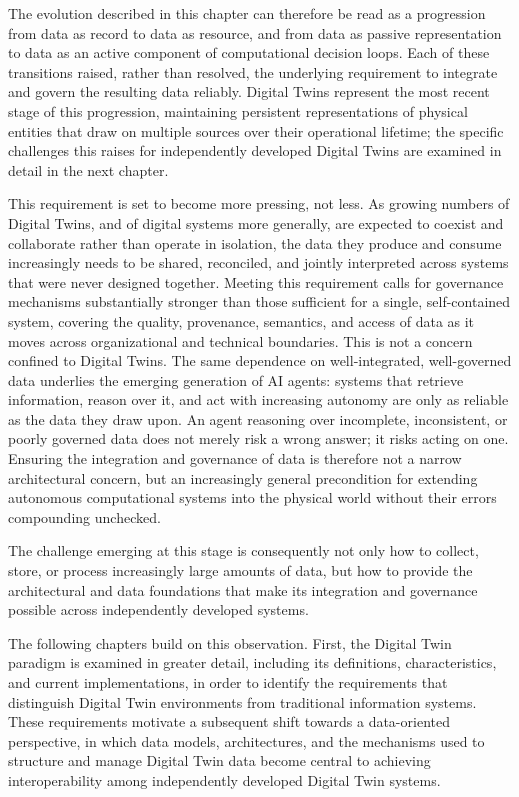 The evolution described in this chapter can therefore be read as a progression from data as record to data as resource, and from data as passive representation to data as an active component of computational decision loops. Each of these transitions raised, rather than resolved, the underlying requirement to integrate and govern the resulting data reliably. Digital Twins represent the most recent stage of this progression, maintaining persistent representations of physical entities that draw on multiple sources over their operational lifetime; the specific challenges this raises for independently developed Digital Twins are examined in detail in the next chapter.

This requirement is set to become more pressing, not less. As growing numbers of Digital Twins, and of digital systems more generally, are expected to coexist and collaborate rather than operate in isolation, the data they produce and consume increasingly needs to be shared, reconciled, and jointly interpreted across systems that were never designed together. Meeting this requirement calls for governance mechanisms substantially stronger than those sufficient for a single, self-contained system, covering the quality, provenance, semantics, and access of data as it moves across organizational and technical boundaries. This is not a concern confined to Digital Twins. The same dependence on well-integrated, well-governed data underlies the emerging generation of AI agents: systems that retrieve information, reason over it, and act with increasing autonomy are only as reliable as the data they draw upon. An agent reasoning over incomplete, inconsistent, or poorly governed data does not merely risk a wrong answer; it risks acting on one. Ensuring the integration and governance of data is therefore not a narrow architectural concern, but an increasingly general precondition for extending autonomous computational systems into the physical world without their errors compounding unchecked.

The challenge emerging at this stage is consequently not only how to collect, store, or process increasingly large amounts of data, but how to provide the architectural and data foundations that make its integration and governance possible across independently developed systems.

The following chapters build on this observation. First, the Digital Twin paradigm is examined in greater detail, including its definitions, characteristics, and current implementations, in order to identify the requirements that distinguish Digital Twin environments from traditional information systems. These requirements motivate a subsequent shift towards a data-oriented perspective, in which data models, architectures, and the mechanisms used to structure and manage Digital Twin data become central to achieving interoperability among independently developed Digital Twin systems.